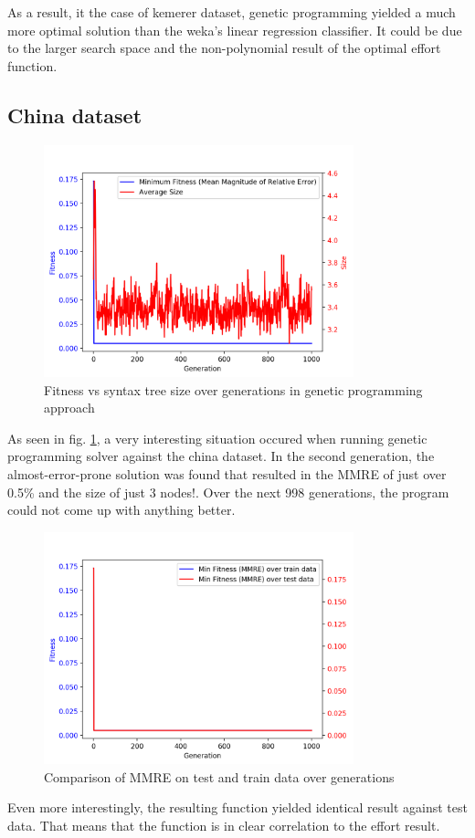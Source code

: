 \documentclass[12pt]{article}
\begin{document}
As a result, it the case of kemerer dataset, genetic programming yielded a much more optimal solution than the weka's linear regression classifier. It could be due to the larger search space and the non-polynomial result of the optimal effort function.

\subsection{China dataset}

\begin{figure}[H]
  \centering
  \includegraphics[width=0.8\textwidth]{results/china/mmre_vs_size}
  \caption{Fitness vs syntax tree size over generations in genetic programming approach}
  \label{fit_vs_syn_china}
\end{figure}
As seen in fig. \ref{fit_vs_syn_china}, a very interesting situation occured when running genetic programming solver against the china dataset. In the second generation, the almost-error-prone solution was found that resulted in the MMRE of just over 0.5\% and the size of just 3 nodes!. Over the next 998 generations, the program could not come up with anything better.

\begin{figure}[H]
  \centering
  \includegraphics[width=0.8\textwidth]{results/china/mmre_train_vs_test}
  \caption{Comparison of MMRE on test and train data over generations}
  \label{train_test_china}
\end{figure}
Even more interestingly, the resulting function yielded identical result against test data. That means that the function is in clear correlation to the effort result.
\end{document}
